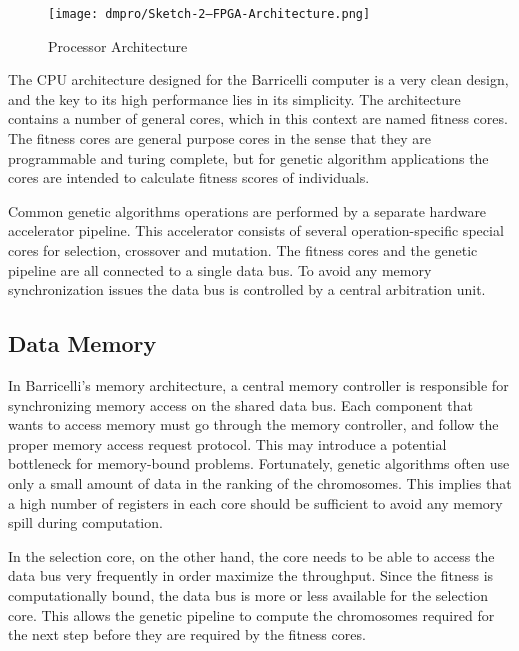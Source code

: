 \begin{figure}[H]
\texttt{[image: dmpro/Sketch-2---FPGA-Architecture.png]}
\caption{Processor Architecture}
\label{figure:fpga-architecture}
\end{figure}

The CPU architecture designed for the Barricelli computer is a very clean design, and the key to its high performance lies in its simplicity.
The architecture contains a number of general cores, which in this context are named fitness cores.
The fitness cores are general purpose cores in the sense that they are programmable and turing complete, but for genetic algorithm applications the cores are intended to calculate fitness scores of individuals.

Common genetic algorithms operations are performed by a separate hardware accelerator pipeline.
This accelerator consists of several operation-specific special cores for selection, crossover and mutation.
The fitness cores and the genetic pipeline are all connected to a single data bus.
To avoid any memory synchronization issues the data bus is controlled by a central arbitration unit.

\subsection{Data Memory}
\label{subsec:fpga-data-memory}

In Barricelli's memory architecture, a central memory controller is responsible for synchronizing memory access on the shared data bus.
Each component that wants to access memory must go through the memory controller, and follow the proper memory access request protocol.
This may introduce a potential bottleneck for memory-bound problems.
Fortunately, genetic algorithms often use only a small amount of data in the ranking of the chromosomes.\cn
This implies that a high number of registers in each core should be sufficient to avoid any memory spill during computation.

In the selection core, on the other hand, the core needs to be able to access the data bus very frequently in order maximize the throughput.
Since the fitness is computationally bound, the data bus is more or less available for the selection core.
This allows the genetic pipeline to compute the chromosomes required for the next step before they are required by the fitness cores. 

